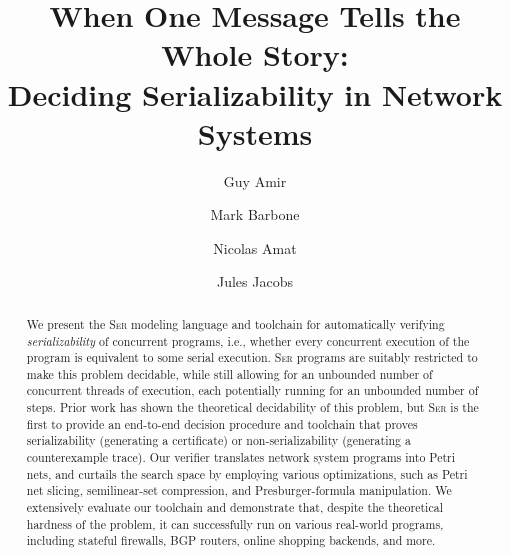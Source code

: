 \documentclass[a4paper]{llncs}
\title{When One Message Tells the Whole Story:\\ Deciding Serializability in Network Systems}
\author{
			Guy Amir \and
			Mark Barbone \and
			Nicolas Amat \and
			Jules Jacobs
		}
\institute{}
\newcommand{\toolname}{\textsc{Ser}}
\let\oldmaketitle\maketitle
\renewcommand{\maketitle}{
  \oldmaketitle
  \pagestyle{plain}  %
  \thispagestyle{plain}  %
}
\begin{document}
\raggedbottom


%	

\maketitle

\begin{abstract}
	We present the \toolname{} modeling language and toolchain for automatically verifying \textit{serializability} of concurrent programs, i.e., whether every concurrent execution of the program is equivalent to some serial execution.
	\toolname{} programs are suitably restricted to make this problem decidable, while still allowing for an unbounded number of concurrent threads of execution, each potentially running for an unbounded number of steps.
	Prior work has shown the theoretical decidability of this problem, but \toolname{} is the first to provide an end-to-end decision procedure and toolchain that proves serializability (generating a certificate) or non-serializability (generating a counterexample trace).
	Our verifier translates network system programs into Petri nets, and curtails the search space by employing various optimizations, such as Petri net slicing, semilinear-set compression, and Presburger-formula manipulation.
	We extensively evaluate our toolchain and demonstrate that, despite the theoretical hardness of the problem, it can successfully run on various real-world programs, including stateful firewalls, BGP routers, online shopping backends, and more.
\end{abstract}












\newpage

{
	
	
}

\newpage
\appendix










\end{document}
